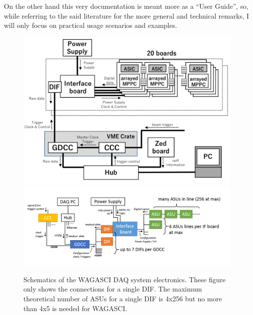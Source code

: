 On the other hand this very documentation is meant more as a ``User Guide'', so,
while referring to the said literature for the more general and technical
remarks, I will only focus on practical usage scenarios and examples.
\begin{figure}[H]
  \centering \includegraphics[width=0.7\linewidth]{DAQ-schematics-1} \\
  \includegraphics[width=0.7\linewidth]{DAQ-schematics-2}
  \caption{Schematics of the WAGASCI DAQ system electronics. These figure only
    shows the connections for a single DIF. The maximum theoretical number of
    ASUs for a single DIF is 4x256 but no more than 4x5 is needed for
    WAGASCI.}\label{DAQ-schematics}
\end{figure}
